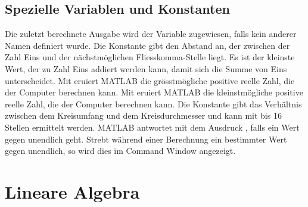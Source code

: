 \subsection{Spezielle Variablen und Konstanten}
Die zuletzt berechnete Ausgabe wird der Variable  zugewiesen, falls kein anderer Namen definiert wurde. Die Konstante  gibt den Abstand an, der zwischen der Zahl Eins und der nächstmöglichen Fliesskomma-Stelle liegt. Es ist der kleinste Wert, der zu Zahl Eins addiert werden kann, damit sich die Summe von Eins unterscheidet. Mit  eruiert MATLAB die grösstmögliche positive reelle Zahl, die der Computer berechnen kann. Mit  eruiert MATLAB die kleinstmögliche positive reelle Zahl, die der Computer berechnen kann. Die Konstante  gibt das Verhältnis zwischen dem Kreisumfang und dem Kreisdurchmesser und kann mit bis 16 Stellen ermittelt werden. MATLAB antwortet mit dem Ausdruck , falls ein Wert gegen unendlich geht. Strebt während einer Berechnung ein bestimmter Wert gegen unendlich, so wird dies im Command Window angezeigt.
\section{Lineare Algebra}
